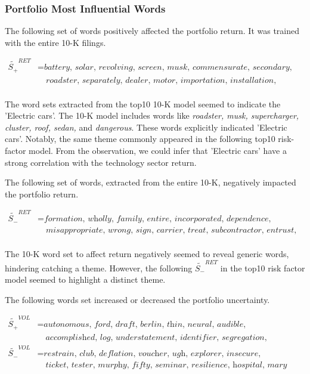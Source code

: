 \documentclass[logo,bsc,singlespacing,parskip]{infthesis}
\begin{document}
\subsubsection{Portfolio Most Influential Words}


The following set of words positively affected the portfolio return. It was trained with the entire 10-K filings.
 
\begin{align*}
\tilde{S_{+}}^{RET} &= \textit{battery, solar, revolving, screen, musk, commensurate, secondary, } \\
               &\quad \textit{roadster, separately, dealer, motor, importation, installation, misstatement, convert} \\
\end{align*}

The word sets extracted from the top10 10-K model seemed to indicate the 'Electric cars'. The 10-K model includes words like \textit{roadster, musk, supercharger, cluster, roof, sedan,} and \textit{dangerous}. These words explicitly indicated 'Electric cars'. Notably, the same theme commonly appeared in the following top10 risk-factor model. From the observation, we could infer that 'Electric cars' have a strong correlation with the technology sector return.  

The following set of words, extracted from the entire 10-K,  negatively impacted the portfolio return.

\begin{align*}
\tilde{S_{-}}^{RET} &= \textit{formation, wholly, family, entire, incorporated, dependence, nationwide, } \\
               &\quad \textit{misappropriate, wrong, sign, carrier, treat, subcontractor, entrust, remotely} \\
\end{align*}

The 10-K word set to affect return negatively seemed to reveal generic words, hindering catching a theme. However, the following $\tilde{S_{-}}^{RET}$ in the top10 risk factor model seemed to highlight a distinct theme.

The following words set increased or decreased the portfolio uncertainty.

\begin{align*}
\tilde{S_{+}}^{VOL} &= \textit{autonomous, ford, draft, berlin, thin, neural, audible,} \\
               &\quad \textit{accomplished, log, understatement, identifier, segregation, subjectivity, race, pilot} \\           
\tilde{S_{-}}^{VOL} &= \textit{restrain, club, deflation, voucher, ugh, explorer, insecure,} \\
               &\quad \textit{ticket, tester, murphy, fifty, seminar, resilience, hospital, mary} \\
\end{align*}
\end{document}

